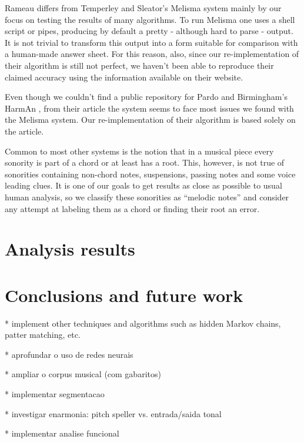 \documentclass{article}
\begin{document}
Rameau differs from Temperley and Sleator's Melisma
\cite{temperley99:modeling} system mainly by our focus on testing the
results of many algorithms. To run Melisma one uses a shell script or
pipes, producing by default a pretty - although hard to parse -
output. It is not trivial to transform this output into a form
suitable for comparison with a human-made answer sheet. For this
reason, also, since our re-implementation of their algorithm is still
not perfect, we haven't been able to reproduce their claimed accuracy
using the information available on their website.

Even though we couldn't find a public repository for Pardo and
Birmingham's HarmAn \cite{pardo99:automated}, from their article the
system seems to face most issues we found with the Melisma system. Our
re-implementation of their algorithm is based solely on the article.

Common to most other systems is the notion that in a musical piece
every sonority is part of a chord or at least has a root. This,
however, is not true of sonorities containing non-chord notes,
suspensions, passing notes and some voice leading clues. It is one of
our goals to get results as close as possible to usual human analysis,
so we classify these sonorities as ``melodic notes'' and consider any
attempt at labeling them as a chord or finding their root an error.
 
\section{Analysis results}
\label{sec:analysis-results}

\section{Conclusions and future work}
\label{sec:concl-future-work}


* implement other techniques and algorithms such as hidden Markov
chains, patter matching, etc.

* aprofundar o uso de redes neurais

* ampliar o corpus musical (com gabaritos)

* implementar segmentacao

* investigar enarmonia: pitch speller vs. entrada/saida tonal

* implementar analise funcional



\end{document}
